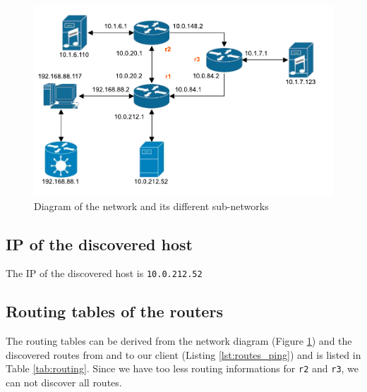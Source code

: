 \documentclass[parskip=full]{scrartcl}
\begin{document}
\begin{figure}[ht]
    \centering
    \includegraphics[width=\textwidth]{network_layout.pdf} 
    \caption{Diagram of the network and its different sub-networks}
    \label{fig:networkLayout}
\end{figure}

\subsection{IP of the discovered host}
The IP of the discovered host is \texttt{10.0.212.52}

\subsection{Routing tables of the routers}
The routing tables can be derived from the network diagram (Figure \ref{fig:networkLayout}) and the discovered routes from and to our client (Listing \ref{lst:routes_ping}) and is listed in Table \ref{tab:routing}.
Since we have too less routing informations for \texttt{r2} and \texttt{r3}, we can not discover all routes.
\end{document}

